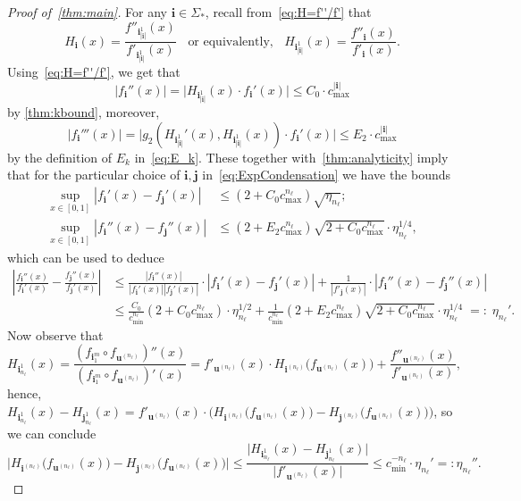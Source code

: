 \documentclass[12pt,]{article}
\def\cref#1{\ref{#1}}%
\theoremstyle{definition}
\theoremstyle{remark}
\newcommand{\0}{\mathbf{0}}
\newcommand{\bi}{\mathbf{i}}
\newcommand{\bj}{\mathbf{j}}
\newcommand{\bu}{\mathbf{u}}
\begin{document}
\begin{proof}[Proof of~\cref{thm:main}]
For any $\bi\in\Sigma_*$, recall from~\cref{eq:H=f''/f'} that
\begin{equation*}
	H_{\bi}(x)= \frac{f''_{\bi_{|\bi|}^1}(x)}{f'_{\bi_{|\bi|}^1}(x)} \;\;\text{ or equivalently,
	}\;\; H_{\bi_{|\bi|}^1}(x) = \frac{f''_{\bi}(x)}{f'_{\bi}(x)}.
\end{equation*}
Using~\eqref{eq:H=f''/f'}, we get that
\begin{equation*}
 |f_{\bi}''(x)| = \big|H_{\bi_{|\bi|}^1}(x)\cdot f_{\bi}'(x)\big|\leq C_0 \cdot c_{\max}^{|\bi|}
\end{equation*}
by \cref{thm:kbound}, moreover,
\begin{equation*}
  |f_{\bi}'''(x)| = \big|g_2(H_{\bi_{|\bi|}^1}'(x),H_{\bi_{|\bi|}^1}(x))\cdot f_{\bi}'(x)\big| \leq
  E_2\cdot c_{\max}^{|\bi|}
\end{equation*}
by the definition of $E_k$ in~\cref{eq:E_k}. These together with~\cref{thm:analyticity} imply that
for the particular choice of $\bi,\bj$ in~\cref{eq:ExpCondensation} we have the bounds
\begin{align*}
 \sup_{x\in[0,1]}|f_{\bi}'(x) - f_{\bj}'(x)| &\leq (2+C_0 c_{\max}^{n_\ell})\sqrt{\eta_{n_\ell}}; \\
 \sup_{x\in[0,1]}|f_{\bi}''(x) - f_{\bj}''(x)| &\leq (2+E_2c_{\max}^{n_\ell})\sqrt{2+C_0
 	c_{\max}^{n_\ell}}\cdot
 \eta_{n_\ell}^{1/4},
\end{align*}
which can be used to deduce
\begin{align*}
	\left|\frac{f_{\bi}''(x)}{f_{\bi}'(x)} - \frac{f_{\bj}''(x)}{f_{\bj}'(x)}\right|
	&\leq
	\frac{|f_{\bi}''(x)|}{|f_{\bi}'(x)||f_{\bj}'(x)|}\cdot|f_{\bi}'(x) - f_{\bj}'(x)|
	+\frac{1}{|f'_{\bj}(x)|} \cdot |f_{\bi}''(x) - f_{\bj}''(x)|
	\\
	&
	\leq \frac{C_0}{c_{\min}^{n_\ell}}(2+C_0c_{\max}^{n_\ell})\cdot \eta_{n_\ell}^{1/2}
	+\frac{1}{c_{\min}^{n_\ell}}(2+E_2
	c_{\max}^{n_\ell})\sqrt{2+C_0 c_{\max}^{n_\ell}} \cdot \eta_{n_\ell}^{1/4} \;=:\;\eta_{n_\ell}'.
\end{align*}
Now observe that
\begin{equation*}
H_{\bi_{n_{\ell}}^1}(x) = \frac{(f_{\bi_1^m}\circ f_{\bu^{(n_{\ell})}})''(x)}{(f_{\bi_1^m}\circ
f_{\bu^{(n_{\ell})}})'(x)} = 
f'_{\bu^{(n_{\ell})}}(x) \cdot H_{\bi^{(n_{\ell})}} \big(f_{\bu^{(n_{\ell})}}(x)\big) + \frac{
f''_{\bu^{(n_{\ell})}}(x) }{ f'_{\bu^{(n_{\ell})}}(x)},
\end{equation*}
hence, $H_{\bi_{n_{\ell}}^1}(x)-H_{\bj_{n_{\ell}}^1}(x) = f'_{\bu^{(n_{\ell})}}(x) \cdot \big(
H_{\bi^{(n_{\ell})}} \big(f_{\bu^{(n_{\ell})}}(x)\big) -H_{\bj^{(n_{\ell})}}
\big(f_{\bu^{(n_{\ell})}}(x)\big) \big)$, so we can conclude
\[
\big| H_{\bi^{(n_{\ell})}} \big(f_{\bu^{(n_{\ell})}}(x)\big) -H_{\bj^{(n_{\ell})}}
\big(f_{\bu^{(n_{\ell})}}(x)\big) \big|
 \leq
 \frac{\big|H_{\bi_{n_{\ell}}^1}(x)-H_{\bj_{n_{\ell}}^1}(x)\big|}{\big|f'_{\bu^{(n_{\ell})}}(x)\big|}
 \leq c_{\min}^{-{n_\ell}}
\cdot \eta_{n_\ell}'
=:\eta_{n_\ell}''.
\]


\end{proof}
\end{document}
